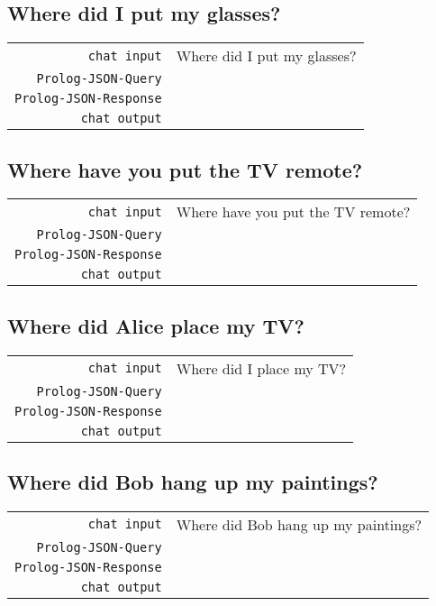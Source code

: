 \documentclass[a4paper,oneside]{scrartcl}
\begin{document}
\subsection{Where did I put my glasses?}
\begin{tabular}{rl}
	\texttt{chat input}		& Where did I put my glasses?	\\
	\texttt{Prolog-JSON-Query}	&			\\
	\texttt{Prolog-JSON-Response}	&			\\
	\texttt{chat output}		& 			\\
\end{tabular}

\subsection{Where have you put the TV remote?}
\begin{tabular}{rl}
	\texttt{chat input}		& Where have you put the TV remote?	\\
	\texttt{Prolog-JSON-Query}	&			\\
	\texttt{Prolog-JSON-Response}	&			\\
	\texttt{chat output}		& 			\\
\end{tabular}

\subsection{Where did Alice place my TV?}
\begin{tabular}{rl}
	\texttt{chat input}		& Where did I place my TV?	\\
	\texttt{Prolog-JSON-Query}	&			\\
	\texttt{Prolog-JSON-Response}	&			\\
	\texttt{chat output}		& 			\\
\end{tabular}

\subsection{Where did Bob hang up my paintings?}
\begin{tabular}{rl}
	\texttt{chat input}		& Where did Bob hang up my paintings?	\\
	\texttt{Prolog-JSON-Query}	&			\\
	\texttt{Prolog-JSON-Response}	&			\\
	\texttt{chat output}		& 			\\
\end{tabular}
\end{document}
